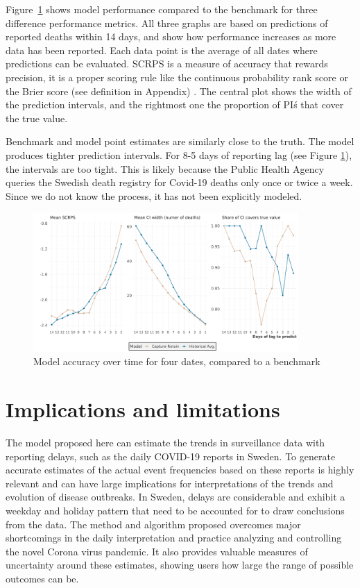 \documentclass[a4paper,11pth]{article}
\begin{document}
Figure~\ref{fig:model_metrics} shows model performance compared to the benchmark for three difference performance metrics. All three graphs are based on predictions of reported deaths within 14 days, and show how performance increases as more data has been reported. Each data point is the average of all dates where predictions can be evaluated. SCRPS is a measure of accuracy that rewards precision, it is a proper scoring rule like the continuous probability rank score or the Brier score (see definition in Appendix) \citep{bolin2019scale}. The central plot shows the width of the prediction intervals, and the rightmost one the proportion of PI\'s that cover the true value.

Benchmark and model point estimates are similarly close to the truth. The model produces tighter prediction intervals. For 8-5 days of reporting lag (see Figure \ref{fig:model_metrics}), the intervals are too tight. This is likely because the Public Health Agency queries the Swedish death registry for Covid-19 deaths only once or twice a week. Since we do not know the process, it has not been explicitly modeled.

\begin{figure}
    \centering
    \includegraphics[width=0.9\textwidth]{plots/model_metrics}
    \caption{Model accuracy over time for four dates, compared to a benchmark}
    \label{fig:model_metrics}
\end{figure}

\section{Implications and limitations}
The model proposed here can estimate the trends in surveillance data with reporting delays, such as the daily COVID-19 reports in Sweden. To generate accurate estimates of the actual event frequencies based on these reports is highly relevant and can have large implications for interpretations of the trends and evolution of disease outbreaks. In Sweden, delays are considerable and exhibit a weekday and holiday pattern that need to be accounted for to draw conclusions from the data. The method and algorithm proposed overcomes major shortcomings in the daily interpretation and practice analyzing and controlling the novel Corona virus pandemic. It also provides valuable measures of uncertainty around these estimates, showing users how large the range of possible outcomes can be.
\end{document}
